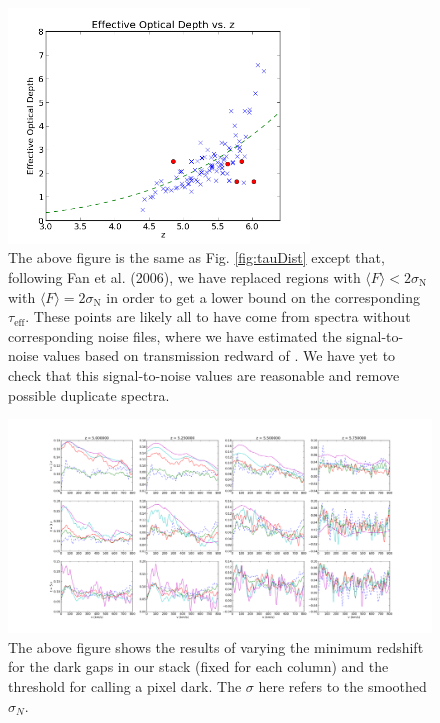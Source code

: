 \documentclass[11pt]{article}
\begin{document}
\begin{figure}[h]
  \centering
  \includegraphics[width=8cm]{tauDistribution_2sigma.png}
  \caption{The above figure is the same as Fig. \ref{fig:tauDist} except that, following Fan et al. (2006), we have replaced regions with  $\langle F \rangle < 2\sigma_{\text{N}}$ with $\langle F \rangle = 2\sigma_{\text{N}}$ in order to get a lower bound on the corresponding $\tau_{\text{eff}}$. These points are likely all to have come from spectra without corresponding noise files, where we have estimated the signal-to-noise values based on transmission redward of \lya. We have yet to check that this signal-to-noise values are reasonable and remove possible duplicate spectra. }
  \label{fig:todo}
\end{figure}

\begin{figure}[h]
  \includegraphics[width=18cm,left]{gridPlot.png}
  \caption{The above figure shows the results of varying the minimum redshift for the dark gaps in our stack (fixed for each column) and the threshold for calling a pixel dark. The $\sigma$ here refers to the smoothed $\sigma_{N}$.}
  \label{fig:gridPlot}
\end{figure}
\end{document}
